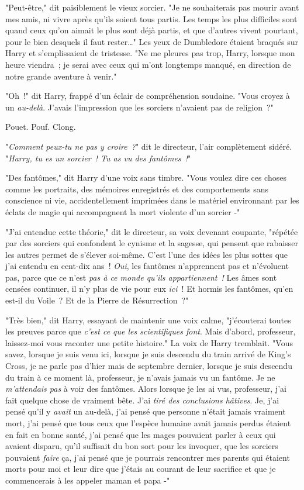 "Peut-être," dit paisiblement le vieux sorcier. "Je ne souhaiterais pas mourir avant mes amis, ni vivre après qu'ils soient tous partis. Les temps les plus difficiles sont quand ceux qu'on aimait le plus sont déjà partis, et que d'autres vivent pourtant, pour le bien desquels il faut rester…" Les yeux de Dumbledore étaient braqués sur Harry et s'emplissaient de tristesse. "Ne me pleures pas trop, Harry, lorsque mon heure viendra~; je serai avec ceux qui m'ont longtemps manqué, en direction de notre grande aventure à venir."

"Oh~!" dit Harry, frappé d'un éclair de compréhension soudaine. "Vous croyez à un \emph{au-delà}. J'avais l'impression que les sorciers n'avaient pas de religion~?"

\later

Pouet. Pouf. Clong.

"\emph{Comment peux-tu ne pas y croire~?}" dit le directeur, l'air complètement sidéré. "\emph{Harry, tu es un sorcier~! Tu as vu des fantômes~!}"

"Des fantômes," dit Harry d'une voix sans timbre. "Vous voulez dire ces choses comme les portraits, des mémoires enregistrés et des comportements sans conscience ni vie, accidentellement imprimées dans le matériel environnant par les éclats de magie qui accompagnent la mort violente d'un sorcier -"

"J'ai entendue cette théorie," dit le directeur, sa voix devenant coupante, "répétée par des sorciers qui confondent le cynisme et la sagesse, qui pensent que rabaisser les autres permet de s'élever soi-même. C'est l'une des idées les plus sottes que j'ai entendu en cent-dix ans~! \emph{Oui}, les fantômes n'apprennent pas et n'évoluent pas, parce que ce n'est \emph{pas à ce monde qu'ils appartiennent~!} Les âmes sont censées continuer, il n'y plus de vie pour eux \emph{ici}~! Et hormis les fantômes, qu'en est-il du Voile~? Et de la Pierre de Résurrection~?"

"Très bien," dit Harry, essayant de maintenir une voix calme, "j'écouterai toutes les preuves parce que \emph{c'est ce que les scientifiques font}. Mais d'abord, professeur, laissez-moi vous raconter une petite histoire." La voix de Harry tremblait. "Vous savez, lorsque je suis venu ici, lorsque je suis descendu du train arrivé de King's Cross, je ne parle pas d'hier mais de septembre dernier, lorsque je suis descendu du train à ce moment là, professeur, je n'avais jamais vu un fantôme. Je ne \emph{m'attendais pas} à voir des fantômes. Alors lorsque je les ai vus, professeur, j'ai fait quelque chose de vraiment bête. J'ai \emph{tiré des conclusions hâtives}. Je, j'ai pensé qu'il y \emph{avait} un au-delà, j'ai pensé que personne n'était jamais vraiment mort, j'ai pensé que tous ceux que l'espèce humaine avait jamais perdus étaient en fait en bonne santé, j'ai pensé que les mages pouvaient parler à ceux qui avaient disparu, qu'il suffisait du bon sort pour les invoquer, que les sorciers pouvaient \emph{faire} ça, j'ai pensé que je pourrais rencontrer mes parents qui étaient morts pour moi et leur dire que j'étais au courant de leur sacrifice et que je commencerais à les appeler maman et papa -"

